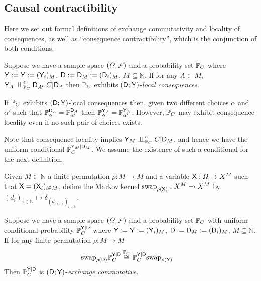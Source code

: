 \subsection{Causal contractibility}\label{sec:ccontracibility}

Here we set out formal definitions of exchange commutativity and locality of consequences, as well as ``consequence contractibility'', which is the conjunction of both conditions.

\begin{definition}\label{def:caus_cont}
Suppose we have a sample space $(\Omega,\mathcal{F})$ and a probability set $\mathbb{P}_C$  where $\mathsf{Y}:=\mathsf{Y}:=(\mathsf{Y}_i)_{M}$, $\mathsf{D}:=\mathsf{D}_M:=(\mathsf{D}_i)_M$, $M\subseteq \mathbb{N}$. If for any $A\subset M$, $\RV{Y}_A\CI^e_{\prob{P}_C} \RV{D}_{A^C} C |\RV{D}_A$ then $\mathbb{P}_C$ exhibits $(\mathsf{D};\mathsf{Y})$-\emph{local consequences}.
\end{definition}

If $\mathbb{P}_C$ exhibits $(\mathsf{D};\mathsf{Y})$-local consequences then, given two different choices $\alpha$ and $\alpha'$ such that $\mathbb{P}_\alpha^{\mathsf{D}_A}=\mathbb{P}_{\alpha'}^{\mathsf{D}_A}$ then $\mathbb{P}_\alpha^{\mathsf{Y}_A}=\mathbb{P}_{\alpha'}^{\mathsf{Y}_A}$. However, $\mathbb{P}_C$ may exhibit consequence locality even if no such pair of choices exists.

Note that consequence locality implies $\RV{Y}_M \CI^e_{\prob{P}_C} C |\RV{D}_M$, and hence we have the uniform conditional $\mathbb{P}_C^{\mathsf{Y}_M|\mathsf{D}_M}$. We assume the existence of such a conditional for the next definition.

\begin{definition}
Given $M\subset \mathbb{N}$ a finite permutation $\rho:M\to M$ and a variable $\mathsf{X}:\Omega\to X^M$ such that $\mathsf{X}=(\mathsf{X}_i)_{i\in M}$, define the Markov kernel $\text{swap}_{\rho(\mathsf{X})}:X^M\rightarrowtriangle X^M$ by $(d_i)_{i\in\mathbb{N}}\mapsto \delta_{(d_{\rho(i)})_{i\in\mathbb{N}}}$.
\end{definition}

\begin{definition}\label{def:caus_exch}
Suppose we have a sample space $(\Omega,\mathcal{F})$ and a probability set $\mathbb{P}_C$ with uniform conditional probability $\mathbb{P}_C^{\mathsf{Y}|\mathsf{D}}$ where $\mathsf{Y}:=\mathsf{Y}:=(\mathsf{Y}_i)_{M}$, $\mathsf{D}:=\mathsf{D}_M:=(\mathsf{D}_i)_M$, $M\subseteq \mathbb{N}$. If for any finite permutation $\rho:M\to M$
\begin{align}
    \text{swap}_{\rho(\mathsf{D})} \mathbb{P}_{C}^{\mathsf{Y}|\mathsf{D}} &\overset{\mathbb{P}_C}{\cong} \mathbb{P}_{C}^{\mathsf{Y}|\mathsf{D}}\text{swap}_{\rho(\mathsf{Y})}
\end{align}
Then $\mathbb{P}_C^{\mathsf{Y}|\mathsf{D}}$ is $(\mathsf{D};\mathsf{Y})$-\emph{exchange commutative}.
\end{definition}

